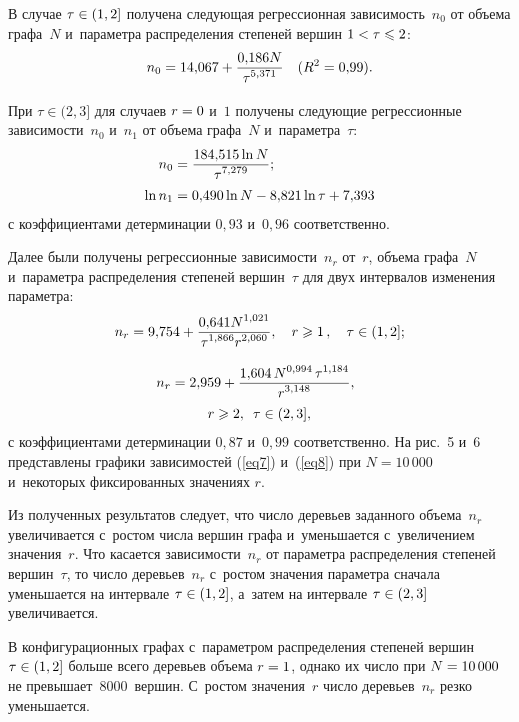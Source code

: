 \begin{multicols}{2}
В случае $\tau\hm\in(1,2]$ получена следующая регрессионная зависимость~$n_0$ от 
объема графа~$N$ и~параметра распределения степеней вершин $1\hm<\tau\hm\leqslant 2$:
\begin{equation*}
n_0 = 14{,}067+\displaystyle\frac{\displaystyle 0{,}186N\mathstrut}{\displaystyle \tau^{5,371}\mathstrut} \quad (R^2=0{,}99).
\end{equation*}

При $\tau\in(2,3]$ для случаев $r\hm=0$ и~$1$ получены следующие регрессионные 
зависимости~$n_0$ и~$n_1$ от объема графа~$N$ и~параметра~$\tau$:
\begin{align*}
n_0 &= \displaystyle\frac{\displaystyle 184{,}515\ln N\mathstrut}{\displaystyle \tau^{7{,}279}\mathstrut};
\\
\ln n_1& = 0{,}490\ln N - 8{,}821\ln\tau + 7{,}393
\end{align*}
с коэффициентами детерминации $0{,}93$ и~$0{,}96$ соответственно.

Далее были получены регрессионные зависимости~$n_r$ от~$r$, объема графа~$N$ и~параметра 
распределения
степеней вершин~$\tau$ для двух интервалов изменения параметра:
\begin{equation}
\label{eq7}
n_r = 9{,}754+\displaystyle\frac{\displaystyle 0{,}641 N^{1{,}021}\mathstrut}{\displaystyle \tau^{1{,}866} r^{2{,}060}\mathstrut}, \quad r\geqslant 1\,, 
\quad \tau\in(1,2];
\end{equation}

\vspace*{-12pt}

\noindent
\begin{multline}
\label{eq8}
\hspace*{-1mm}n_r = 2{,}959+\displaystyle\frac{\displaystyle 1{,}604\,N^{0,994}\,\tau^{1,184}\mathstrut}{\displaystyle r^{3,148}\mathstrut},\hspace*{1mm} \\
 r\geqslant 2,  \enskip \tau\in(2,3],
\end{multline}
с коэффициентами детерминации $0,87$ и~$0,99$ соответственно.
На рис.~5 и~6 представлены графики зависимостей (\ref{eq7}) и~(\ref{eq8}) при 
$N=10\,000$ и~некоторых фиксированных значениях $r$.



Из полученных результатов следует, что число деревьев заданного объема~$n_r$ 
увеличивается с~рос\-том чис\-ла вершин графа и~уменьшается с~увеличением значения~$r$. 
Что касается за\-ви\-си\-мости~$n_r$ от па\-ра\-мет\-ра распределения степеней вершин~$\tau$, 
то чис\-ло деревьев~$n_r$ с~ростом значения па\-ра\-мет\-ра сначала уменьшается 
на интервале $\tau\hm\in(1,2]$, а~затем на интервале $\tau\hm\in(2,3]$ увеличивается.

В конфигурационных графах с~параметром распределения степеней вершин 
$\tau\hm\in(1,2]$ больше всего деревьев объема $r\hm=1$, однако их чис\-ло при 
$N\hm=10\,000$ не превышает~8000~вершин. С~рос\-том значения~$r$ чис\-ло деревьев~$n_r$ 
резко уменьшается.\linebreak\vspace*{-12pt}


\end{multicols}
